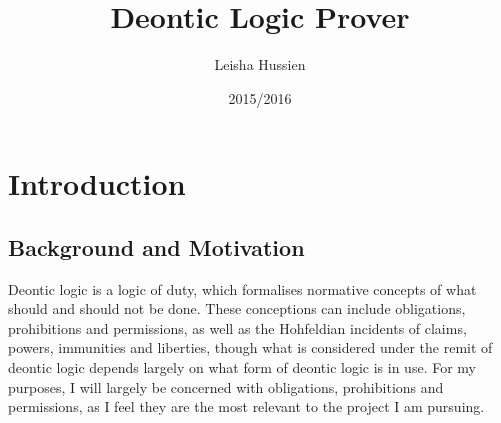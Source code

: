 \documentclass{l4proj}
\begin{document}
\title{Deontic Logic Prover}
\author{Leisha Hussien}
\date{2015/2016}
\maketitle

\begin{abstract}

\end{abstract}

\educationalconsent

\tableofcontents













\chapter{Introduction}

\section{Background and Motivation}%
Deontic logic is a logic of duty, which formalises normative concepts of what should and should not be done. These conceptions can include obligations, prohibitions and permissions, as well as the Hohfeldian incidents\cite{Hohfeld} of claims, powers, immunities and liberties, though what is considered under the remit of deontic logic depends largely on what form of deontic logic is in use. For my purposes, I will largely be concerned with obligations, prohibitions and permissions, as I feel they are the most relevant to the project I am pursuing.
\end{document}
